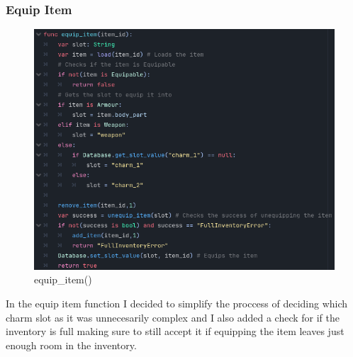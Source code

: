 \documentclass{article}
\begin{document}
        \subsubsection{Equip Item}
        \begin{figure}[H]
                \centering
                \includegraphics[width=0.8\columnwidth]{images/development/equip_item.PNG}
                \caption{equip\_item()}
        \end{figure}
        In the equip item function I decided to simplify the proccess of deciding which charm slot as it was unnecesarily complex and I also added a check for if the inventory is full making sure to still accept it if equipping the item leaves just enough room in the inventory.\\
\end{document}
